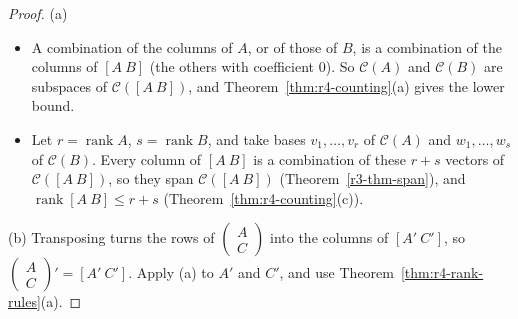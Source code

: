 \documentclass[12pt]{article}
\DeclareMathOperator{\rank}{rank}
\theoremstyle{definition}
\begin{document}
\begin{proof}
(a)
\begin{itemize}
\item A combination of the columns of \(A\), or of those of \(B\), is a combination of the columns
of \([A\ B]\) (the others with coefficient \(0\)). So \(\mathcal C(A)\) and \(\mathcal C(B)\) are
subspaces of \(\mathcal C([A\ B])\), and Theorem~\ref{thm:r4-counting}(a) gives the lower bound.
\item Let \(r=\rank A\), \(s=\rank B\), and take bases \(v_1,\dots,v_r\) of \(\mathcal C(A)\) and
\(w_1,\dots,w_s\) of \(\mathcal C(B)\). Every column of \([A\ B]\) is a combination of these
\(r+s\) vectors of \(\mathcal C([A\ B])\), so they span \(\mathcal C([A\ B])\) (Theorem~\ref{r3-thm-span}), and
\(\rank[A\ B]\leqslant r+s\) (Theorem~\ref{thm:r4-counting}(c)).
\end{itemize}
(b) Transposing turns the rows of \(\left(\begin{smallmatrix}A\\C\end{smallmatrix}\right)\) into the
columns of \([A'\ C']\), so \(\left(\begin{smallmatrix}A\\C\end{smallmatrix}\right)'=[A'\ C']\).
Apply (a) to \(A'\) and \(C'\), and use Theorem~\ref{thm:r4-rank-rules}(a).


\end{proof}
\end{document}
